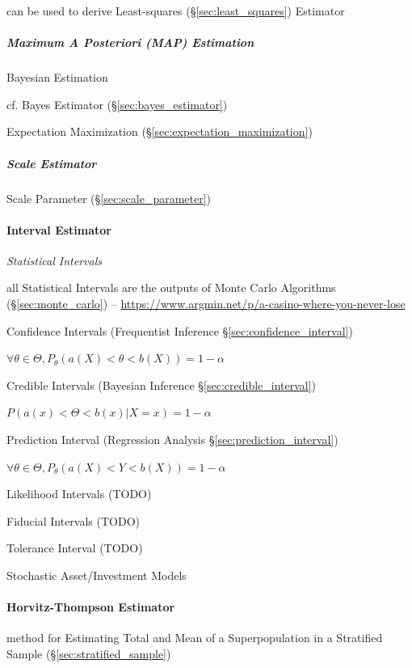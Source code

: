 can be used to derive Least-squares (\S\ref{sec:least_squares}) Estimator



\subparagraph{Maximum A Posteriori (MAP) Estimation}
\label{sec:map_estimator}\hfill

Bayesian Estimation

cf. Bayes Estimator (\S\ref{sec:bayes_estimator})

Expectation Maximization (\S\ref{sec:expectation_maximization})



\subparagraph{Scale Estimator}\label{sec:scale_estimator}

Scale Parameter (\S\ref{sec:scale_parameter})



\paragraph{Interval Estimator}\label{sec:interval_estimator}\hfill

\emph{Statistical Intervals}

all Statistical Intervals are the outputs of Monte Carlo Algorithms
(\S\ref{sec:monte_carlo}) --
\url{https://www.argmin.net/p/a-casino-where-you-never-lose}

Confidence Intervals (Frequentist Inference \S\ref{sec:confidence_interval})

$\forall \theta \in \Theta, P_\theta(a(X) < \theta < b(X)) = 1 - \alpha$

Credible Intervals (Bayesian Inference \S\ref{sec:credible_interval})

$P(a(x) < \Theta < b(x) | X = x) = 1 - \alpha$

Prediction Interval (Regression Analysis \S\ref{sec:prediction_interval})

$\forall \theta \in \Theta, P_\theta(a(X) < Y < b(X)) = 1 - \alpha$

Likelihood Intervals (TODO)

Fiducial Intervals (TODO)

Tolerance Interval (TODO)

Stochastic Asset/Investment Models



\paragraph{Horvitz-Thompson Estimator}\label{sec:horvitz_thompson}\hfill

method for Estimating Total and Mean of a Superpopulation in a Stratified Sample
(\S\ref{sec:stratified_sample})

